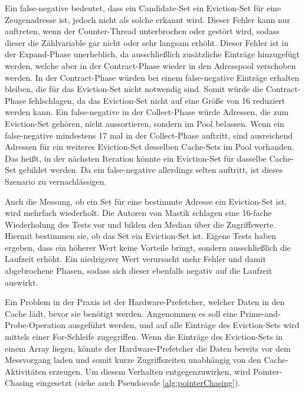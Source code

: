 Ein false-negative bedeutet, dass ein Candidate-Set ein Eviction-Set für eine Zeugenadresse ist, jedoch nicht als solche erkannt wird.
Dieser Fehler kann nur auftreten, wenn der Counter-Thread unterbrochen oder gestört wird, sodass dieser die Zählvariable gar nicht oder sehr langsam erhöht.
Dieser Fehler ist in der Expand-Phase unerheblich, da ausschließlich zusätzliche Einträge hinzugefügt werden, welche aber in der Contract-Phase wieder in den Adresspool verschoben werden.
In der Contract-Phase würden bei einem false-negative Einträge erhalten bleiben, die für das Eviction-Set nicht notwendig sind. Somit würde die Contract-Phase fehlschlagen, da das Eviction-Set nicht auf eine Größe von 16 reduziert werden kann.
Ein false-negative in der Collect-Phase würde Adressen, die zum Eviction-Set gehören, nicht aussortieren, sondern im Pool belassen.
Wenn ein false-negative mindestens 17 mal in der Collect-Phase auftritt, sind ausreichend Adressen für ein weiteres Eviction-Set desselben Cache-Sets im Pool vorhanden. Das heißt, in der nächsten Iteration könnte ein Eviction-Set für dasselbe Cache-Set gebildet werden.
Da ein false-negative allerdings selten auftritt, ist dieses Szenario zu vernachlässigen.


Auch die Messung, ob ein Set für eine bestimmte Adresse ein Eviction-Set ist, wird mehrfach wiederholt.
Die Autoren von Mastik schlagen eine 16-fache Wiederholung des Tests vor und bilden den Median über die Zugriffswerte. Hiermit bestimmen sie, ob das Set ein Eviction-Set ist.
Eigene Tests haben ergeben, dass ein höherer Wert keine Vorteile bringt, sondern ausschließlich die Laufzeit erhöht. Ein niedrigerer Wert verursacht mehr Fehler und damit abgebrochene Phasen, sodass sich dieser ebenfalls negativ auf die Laufzeit auswirkt.

Ein Problem in der Praxis ist der Hardware-Prefetcher, welcher Daten in den Cache lädt, bevor sie benötigt werden.
Angenommen es soll eine Prime-and-Probe-Operation ausgeführt werden, und auf alle Einträge des Eviction-Sets wird mittels einer For-Schleife zugegriffen.
Wenn die Einträge des Eviction-Sets in einem Array liegen, könnte der Hardware-Prefetcher die Daten bereits vor dem Messvorgang laden und somit kurze Zugriffszeiten unabhängig von den Cache-Aktivitäten erzeugen.
Um diesem Verhalten entgegenzuwirken, wird Pointer-Chasing eingesetzt (siehe auch Pseudocode \ref{alg:pointerChasing}).

